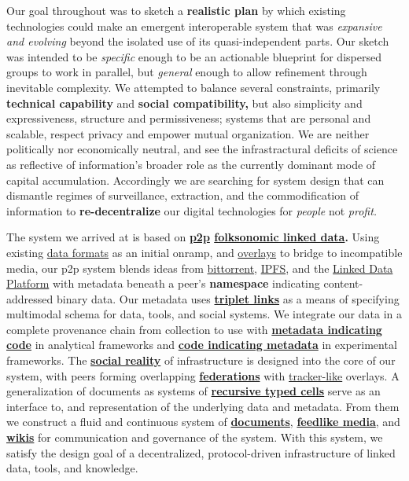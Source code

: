 Our goal throughout was to sketch a \textbf{realistic plan} by which
existing technologies could make an emergent interoperable system that
was \emph{expansive and evolving} beyond the isolated use of its
quasi-independent parts. Our sketch was intended to be \emph{specific}
enough to be an actionable blueprint for dispersed groups to work in
parallel, but \emph{general} enough to allow refinement through
inevitable complexity. We attempted to balance several constraints,
primarily \textbf{technical capability} and \textbf{social
compatibility,} but also simplicity and expressiveness, structure and
permissiveness; systems that are personal and scalable, respect privacy
and empower mutual organization. We are neither politically nor
economically neutral, and see the infrastractural deficits of science as
reflective of information's broader role as the currently dominant mode
of capital accumulation. Accordingly we are searching for system design
that can dismantle regimes of surveillance, extraction, and the
commodification of information to \textbf{re-decentralize} our digital
technologies for \emph{people} not \emph{profit.}

The system we arrived at is based on
\textbf{\protect\hyperlink{peer-to-peer-as-a-backbone}{p2p}
\protect\hyperlink{folk-federation}{folksonomic linked data}.} Using
existing \protect\hyperlink{formats-as-onramps}{data formats} as an
initial onramp, and
\protect\hyperlink{overlays--adversarial-interoperability}{overlays} to
bridge to incompatible media, our p2p system blends ideas from
\href{http://www.bittorrent.org/beps/bep_0003.html}{bittorrent},
\href{https://docs.ipfs.io/}{IPFS}, and the
\href{https://www.w3.org/TR/ldp/}{Linked Data Platform} with metadata
beneath a peer's \textbf{namespace} indicating content-addressed binary
data. Our metadata uses
\protect\hyperlink{the-core-format-of-linked-data-is-the-resource-document-format-r}{\textbf{triplet
links}} as a means of specifying multimodal schema for data, tools, and
social systems. We integrate our data in a complete provenance chain
from collection to use with
\protect\hyperlink{analytical-frameworks}{\textbf{metadata indicating
code}} in analytical frameworks and
\protect\hyperlink{experimental-frameworks}{\textbf{code indicating
metadata}} in experimental frameworks. The
\protect\hyperlink{infrastructure-is-social}{\textbf{social reality}} of
infrastructure is designed into the core of our system, with peers
forming overlapping
\protect\hyperlink{the-design-of-federations-of-peers-is-intended-to-resolve-severa}{\textbf{federations}}
with \protect\hyperlink{archives-need-communities}{tracker-like}
overlays. A generalization of documents as systems of
\protect\hyperlink{documents--notebooks}{\textbf{recursive typed cells}}
serve as an interface to, and representation of the underlying data and
metadata. From them we construct a fluid and continuous system of
\protect\hyperlink{documents--notebooks}{\textbf{documents}},
\protect\hyperlink{forums--feeds}{\textbf{feedlike media}}, and
\protect\hyperlink{trackers-clients--wikis}{\textbf{wikis}} for
communication and governance of the system. With this system, we satisfy
the design goal of a decentralized, protocol-driven infrastructure of
linked data, tools, and knowledge.

